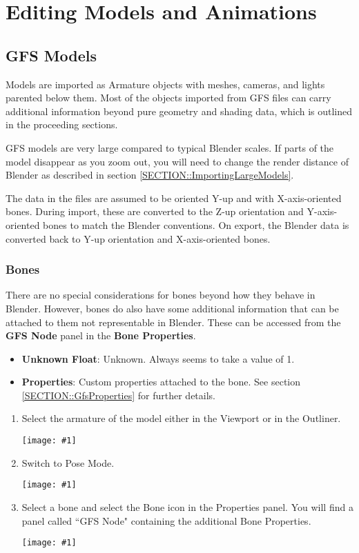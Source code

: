 \documentclass{article}
\newenvironment{guide}[1]
{
	\begin{center}
		\begin{tcolorbox}[%
			colback=black!20, 
			boxrule=0pt, 
			title=Step-by-step: #1,
			enhanced,
			breakable,
			overlay unbroken={%
                \draw[line width=1pt, black, rounded corners]
        	    (frame.north west) rectangle (frame.south east);
			},
    		overlay first={%
        		 \draw[line width=1pt, black, rounded corners]
        	    (frame.south west) -- (frame.north west) -- (frame.north east) -- (frame.south east);
                \draw[line width=1pt, black]
                (frame.south west) -- (frame.south east);
            },
    		overlay middle={%
                \draw[line width=1pt, black]
        	    (frame.north west) rectangle (frame.south east);
        	},
    		overlay last={%
                \draw[line width=1pt, black, rounded corners]
        	    (frame.north west) -- (frame.south west) -- (frame.south east) -- (frame.north east);
                \draw[line width=1pt, black]
                (frame.north west) -- (frame.north east);
           	}
        ]{}
    	\begin{enumerate}
}
{
    		\end{enumerate}
    	\end{tcolorbox}
	\end{center}  	 
}
\newcommand{\guideimage}[1]
{
	\begin{center}
		\texttt{[image: \#1]}
	\end{center}
}
\begin{document}
\clearpage

\section{Editing Models and Animations}
\subsection{GFS Models}
Models are imported as Armature objects with meshes, cameras, and lights parented below them. Most of the objects imported from GFS files can carry additional information beyond pure geometry and shading data, which is outlined in the proceeding sections.

GFS models are very large compared to typical Blender scales. If parts of the model disappear as you zoom out, you will need to change the render distance of Blender as described in section \ref{SECTION::ImportingLargeModels}.

The data in the files are assumed to be oriented Y-up and with X-axis-oriented bones. During import, these are converted to the Z-up orientation and Y-axis-oriented bones to match the Blender conventions. On export, the Blender data is converted back to Y-up orientation and X-axis-oriented bones. 

\subsubsection{Bones}
\label{SECTION::EditingBones} 
There are no special considerations for bones beyond how they behave in Blender. However, bones do also have some additional information that can be attached to them not representable in Blender. These can be accessed from the \textbf{GFS Node} panel in the \textbf{Bone Properties}.

\begin{itemize}
\item \textbf{Unknown Float}: Unknown. Always seems to take a value of 1.
\item \textbf{Properties}: Custom properties attached to the bone. See section \ref{SECTION::GfsProperties} for further details.
\end{itemize}

\begin{guide}{Accessing Extra Bone Properties}
\item Select the armature of the model either in the Viewport or in the Outliner.
\guideimage{images/editing_models/edits_select_armature.png}
\item Switch to Pose Mode.
\guideimage{images/editing_models/edits_to_pose_mode.png}
\item Select a bone and select the Bone icon in the Properties panel. You will find a panel called ``GFS Node" containing the additional Bone Properties.
\guideimage{images/editing_models/edits_bone_properties.png}
\end{guide}
\clearpage
\end{document}
